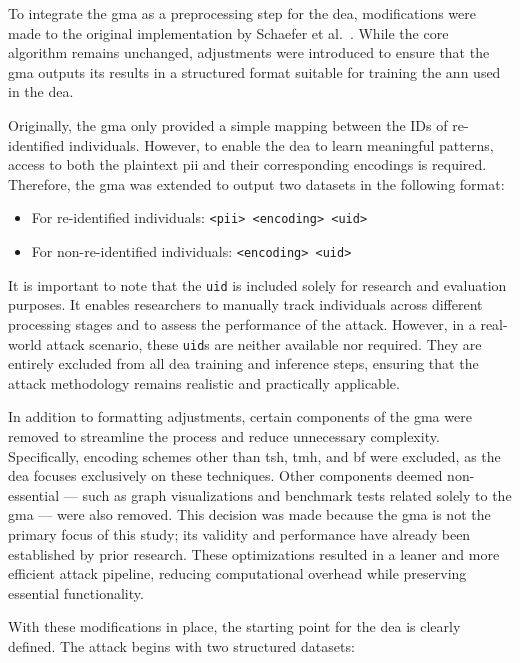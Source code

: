 To integrate the \ac{gma} as a preprocessing step for the \ac{dea}, modifications were made to the original implementation by Schaefer et al.~\cite{schaefer2024}.
While the core algorithm remains unchanged, adjustments were introduced to ensure that the \ac{gma} outputs its results in a structured format suitable for training the \ac{ann} used in the \ac{dea}.

Originally, the \ac{gma} only provided a simple mapping between the IDs of re-identified individuals.
However, to enable the \ac{dea} to learn meaningful patterns, access to both the plaintext \ac{pii} and their corresponding encodings is required.
Therefore, the \ac{gma} was extended to output two datasets in the following format:

\begin{itemize}
    \item For re-identified individuals: \texttt{<\ac{pii}> <encoding> <uid>}
    \item For non-re-identified individuals: \texttt{<encoding> <uid>}
\end{itemize}

It is important to note that the \texttt{uid} is included solely for research and evaluation purposes.
It enables researchers to manually track individuals across different processing stages and to assess the performance of the attack.
However, in a real-world attack scenario, these \texttt{uid}s are neither available nor required.
They are entirely excluded from all \ac{dea} training and inference steps, ensuring that the attack methodology remains realistic and practically applicable.

In addition to formatting adjustments, certain components of the \ac{gma} were removed to streamline the process and reduce unnecessary complexity.
Specifically, encoding schemes other than \ac{tsh}, \ac{tmh}, and \ac{bf} were excluded, as the \ac{dea} focuses exclusively on these techniques.
Other components deemed non-essential — such as graph visualizations and benchmark tests related solely to the \ac{gma} — were also removed.
This decision was made because the \ac{gma} is not the primary focus of this study; its validity and performance have already been established by prior research.
These optimizations resulted in a leaner and more efficient attack pipeline, reducing computational overhead while preserving essential functionality.

With these modifications in place, the starting point for the \ac{dea} is clearly defined.
The attack begins with two structured datasets:

